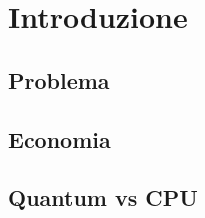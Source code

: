 \section{Introduzione}\label{sec:introduction}

\subsection{Problema}\label{sec:problema}
\subsection{Economia}\label{sec:economia}
\subsection{Quantum vs CPU}\label{sec:QCvsCPU}